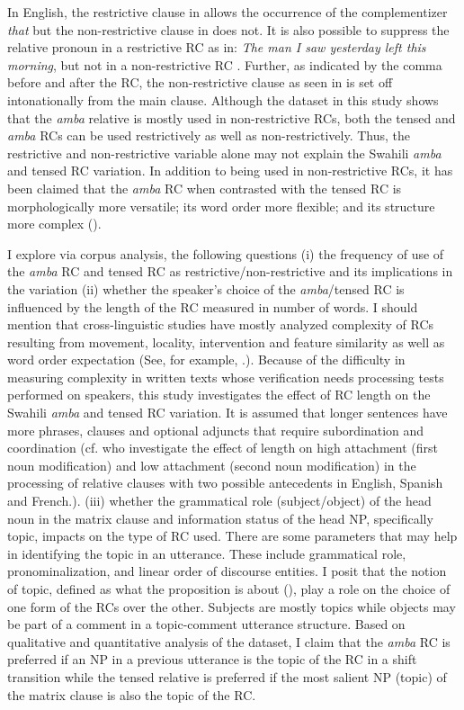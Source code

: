 \documentclass[output=paper,colorlinks,citecolor=brown]{langscibook}
\begin{document}
In English, the restrictive clause in  allows the occurrence of the complementizer \textit{that} but the non-restrictive clause in  does not. It is also possible to suppress the relative pronoun in a restrictive RC as in: \textit{The man I saw yesterday left this morning}, but not in a non-restrictive RC \citep[139]{Comrie1989}. Further, as indicated by the comma before and after the RC, the non-restrictive clause as seen in  is set off intonationally from the main clause. Although the dataset in this study shows that the \textit{amba} relative is mostly used in non-restrictive RCs, both the tensed and \textit{amba} RCs can be used restrictively as well as non-restrictively. Thus, the restrictive and non-restrictive variable alone may not explain the Swahili \textit{amba} and tensed RC variation. In addition to being used in non-restrictive RCs, it has been claimed that the \textit{amba} RC when contrasted with the tensed RC is morphologically more versatile; its word order more flexible; and its structure more complex (\citealt{Schadeberg1989, Russell1992}).

I explore via corpus analysis, the following questions (i) the frequency of use of the \textit{amba} RC and tensed RC as restrictive/non-restrictive and its implications in the variation (ii) whether the speaker’s choice of the \textit{amba}/tensed RC is influenced by the length of the RC measured in number of words. I should mention that cross-linguistic studies have mostly analyzed complexity of RCs resulting from movement, locality, intervention and feature similarity as well as word order expectation (See, for example, \citealt{DurrlemanEtAl2016, Rizzi2013Locality, LevyEtAl2013}.). Because of the difficulty in measuring complexity in written texts whose verification needs processing tests performed on speakers, this study investigates the effect of RC length on the Swahili \textit{amba} and tensed RC variation. It is assumed that longer sentences have more phrases, clauses and optional adjuncts that require subordination and coordination (cf. \citealt{HemforthEtAl2015} who investigate the effect of length on high attachment (first noun modification) and low attachment (second noun modification) in the processing of relative clauses with two possible antecedents in English, Spanish and French.). (iii) whether the grammatical role (subject/object) of the head noun in the matrix clause and information status of the head NP, specifically topic, impacts on the type of RC used. There are some parameters that may help in identifying the topic in an utterance. These include grammatical role, pronominalization, and linear order of discourse entities. I posit that the notion of topic, defined as what the proposition is about (\citealt{Gundel1985, Lambrecht1994}), play a role on the choice of one form of the RCs over the other. Subjects are mostly topics while objects may be part of a comment in a topic-comment utterance structure. Based on qualitative and quantitative analysis of the dataset, I claim that the \textit{amba} RC is preferred if an NP in a previous utterance is the topic of the RC in a shift transition while the tensed relative is preferred if the most salient NP (topic) of the matrix clause is also the topic of the RC.
\end{document}
